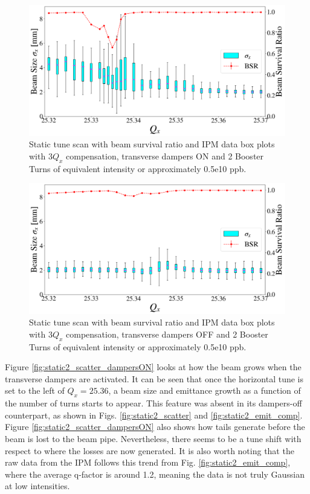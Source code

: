 \newpage
\begin{figure}[H]
    \centering
    \includegraphics[width=\columnwidth]{chapter6/static2turns_ipm_dampersON.png}
    \caption{Static tune scan with beam survival ratio and IPM data box plots with $3Q_x$ compensation, transverse dampers ON and 2 Booster Turns of equivalent intensity or approximately 0.5e10 ppb.}
    \label{fig:static2_dampersON}
   \vspace{-1.25em}
\end{figure}

\begin{figure}[H]
    \centering
    \includegraphics[width=\columnwidth]{chapter6/static2turns_ipm_dampersOFF.png}
    \caption{Static tune scan with beam survival ratio and IPM data box plots with $3Q_x$ compensation, transverse dampers OFF and 2 Booster Turns of equivalent intensity or approximately 0.5e10 ppb.}
    \label{fig:static2_dampersOFF}
   \vspace{-1.25em}
\end{figure}
\newpage

Figure \ref{fig:static2_scatter_dampersON} looks at how the beam grows when the transverse dampers are activated. It can be seen that once the horizontal tune is set to the left of $Q_x=25.36$, a beam size and emittance growth as a function of the number of turns starts to appear. This feature was absent in its dampers-off counterpart, as shown in Figs. \ref{fig:static2_scatter} and \ref{fig:static2_emit_comp}. Figure \ref{fig:static2_scatter_dampersON} also shows how tails generate before the beam is lost to the beam pipe. Nevertheless, there seems to be a tune shift with respect to where the losses are now generated. It is also worth noting that the raw data from the IPM follows this trend from Fig. \ref{fig:static2_emit_comp}, where the average q-factor is around 1.2, meaning the data is not truly Gaussian at low intensities.

